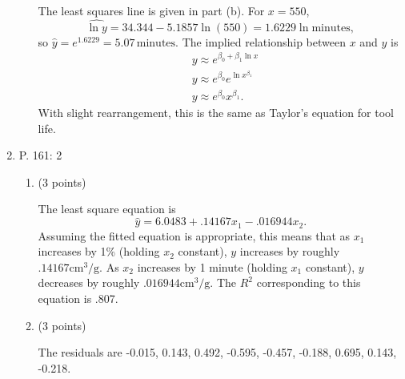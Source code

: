 \documentclass{article}\usepackage[]{graphicx}\usepackage[]{color}
\newenvironment{knitrout}{}{} %
\begin{document}
\begin{enumerate}
\begin{enumerate}
  The least squares line is given in part (b). For $x = 550$,
  \[\widehat{\ln y} = 34.344 - 5.1857\ln(550) = 1.6229\ln{\mathrm{minutes}},\]
  so $\hat{y} = e^{1.6229} = 5.07\, \mathrm{minutes}$. The implied relationship between $x$ and $y$ is 
  \begin{align*}
  &y \approx e^{\beta_0 + \beta_1 \ln x}\\
  &y \approx e^{\beta_0} e^{\ln x^{\beta_1}}\\
  &y \approx e^{\beta_0} x^{\beta_1}.
  \end{align*}
  With slight rearrangement, this is the same as Taylor's equation for tool life.
	\end{enumerate}
	
	\clearpage
	\item P. 161: 2 

  \begin{enumerate}
  \item (3 points)
  
  The least square equation is
  \[\hat{y} = 6.0483 + .14167x_1 - .016944x_2.\]
  Assuming the fitted equation is appropriate, this means that as $x_1$ increases by 1\% (holding $x_2$ constant), $y$ increases by roughly $.14167 \mathrm{cm}^3\mathrm{\slash g}$. As $x_2$ increases by 1 minute (holding $x_1$ constant), $y$ decreases by roughly $.016944\mathrm{cm}^3\mathrm{\slash g}$. The $R^2$ corresponding to this equation is .807.
  
  \item (3 points)
  
  The residuals are -0.015, 0.143, 0.492, -0.595, -0.457, -0.188, 0.695, 0.143, -0.218.
  
\begin{knitrout}
\color{fgcolor}


\end{knitrout}
\end{enumerate}
\end{enumerate}
\end{document}

